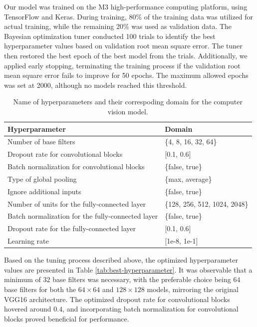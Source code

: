 \documentclass[]{interact}
\theoremstyle{plain}%
\theoremstyle{definition}
\theoremstyle{remark}
\begin{document}
Our model was trained on the M3 high-performance computing platform,
using TensorFlow and Keras. During training, 80\% of the training data
was utilized for actual training, while the remaining 20\% was used as
validation data. The Bayesian optimization tuner conducted 100 trials to
identify the best hyperparameter values based on validation root mean
square error. The tuner then restored the best epoch of the best model
from the trials. Additionally, we applied early stopping, terminating
the training process if the validation root mean square error fails to
improve for 50 epochs. The maximum allowed epochs was set at 2000,
although no models reached this threshold.

\begin{table}

\caption{\label{tab:hyperparameter}Name of hyperparameters and their correspoding domain for the computer vision model.}
\centering
\begin{tabular}[t]{ll}
\toprule
Hyperparameter & Domain\\
\midrule
Number of base filters & \{4, 8, 16, 32, 64\}\\
Dropout rate for convolutional blocks & {}[0.1, 0.6]\\
Batch normalization for convolutional blocks & \{false, true\}\\
Type of global pooling & \{max, average\}\\
Ignore additional inputs & \{false, true\}\\
\addlinespace
Number of units for the fully-connected layer & \{128, 256, 512, 1024, 2048\}\\
Batch normalization for the fully-connected layer & \{false, true\}\\
Dropout rate for the fully-connected layer & {}[0.1, 0.6]\\
Learning rate & {}[1e-8, 1e-1]\\
\bottomrule
\end{tabular}
\end{table}

Based on the tuning process described above, the optimized
hyperparameter values are presented in Table
\ref{tab:best-hyperparameter}. It was observable that a minimum of
\(32\) base filters was necessary, with the preferable choice being
\(64\) base filters for both the \(64 \times 64\) and \(128 \times 128\)
models, mirroring the original VGG16 architecture. The optimized dropout
rate for convolutional blocks hovered around \(0.4\), and incorporating
batch normalization for convolutional blocks proved beneficial for
performance.
\end{document}

